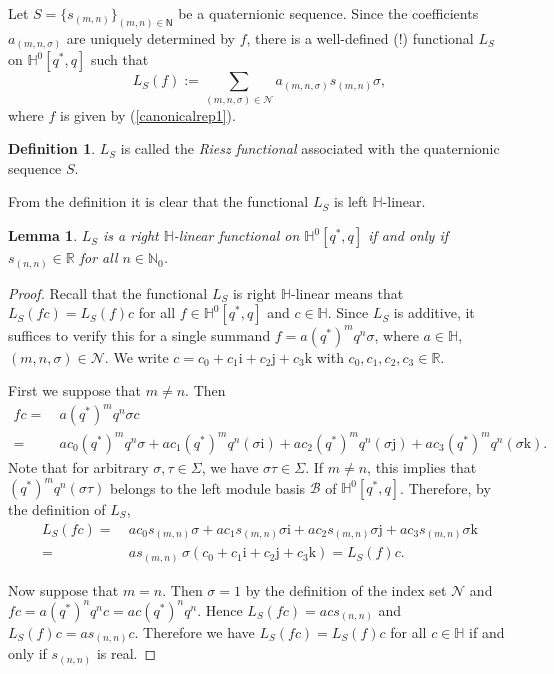 \documentclass[11pt,a4paper]{amsart}
\newtheorem{lemma}[theorem]{Lemma}
\theoremstyle{definition}
\newtheorem{definition}[theorem]{Definition}
\begin{document}
Let $S=\{s_{(m,n)}\}_{(m,n) \in \mathsf{{N}}}$ be a quaternionic sequence. Since
the coefficients $a_{(m,n,\sigma )}$ are uniquely determined by $f$, there
is a well-defined (!) functional $L_{S}$ on
$\mathbb{H}^{0}[q^{*}, q]$ such that
%
\begin{equation}
\label{defintionriesz}
L_{S}(f) := \sum _{(m,n,\sigma )\in \mathcal{N}} a_{(m,n,\sigma )}s_{(m,n)}
\sigma ,
\end{equation}
%
where $f$ is given by (\ref{canonicalrep1}).
%
\begin{definition}
\label{defn5.1}
$L_{S}$ is called the \emph{Riesz functional} associated with the quaternionic
sequence $S$.
\end{definition}

From the definition it is clear that the functional $L_{S}$ is left
$\mathbb{H}$-linear.
%
\begin{lemma}%
\label{twosidedls}
$L_{S}$ is a right $\mathbb{H}$-linear functional on $ \mathbb{H}^{0}[q^{*}, q]$ if and only if $s_{(n,n)}\in \mathbb{R}$ for
all $n\in \mathbb{N}_{0}$.
\end{lemma}
%
\begin{proof}
Recall that the functional $L_{S}$ is right $\mathbb{H}$-linear means that
$L_{S}(f c)=L_{S}(f)c$ for all $f\in \mathbb{H}^{0}[q^{*}, q]$ and
$c\in \mathbb{H}$. Since $L_{S}$ is additive, it suffices to verify this
for a single summand $f=a (q^{*})^{m} q^{n} \sigma $, where
$a\in \mathbb{H}$, $(m,n,\sigma )\in \mathcal{N}$. We write
$c =c_{0}+c_{1}\mathrm{i}+c_{2}\mathrm{j}+ c_{3}\mathrm{k}$ with
$c_{0}, c_{1},c_{2},c_{3}\in \mathbb{R}$.

First we suppose that $m\neq n$. Then
%
\begin{align*}
f c =& ~ a (q^{*})^{m} q^{n} \sigma c
\\
= & ~ a c_{0} (q^{*})^{m} q^{n} \sigma + a c_{1} (q^{*})^{m} q^{n} (
\sigma \mathrm{i}) + a c_{2} (q^{*})^{m} q^{n} (\sigma \mathrm{j})+ a c_{3}
(q^{*})^{m} q^{n} (\sigma \mathrm{k}).
\end{align*}
%
Note that for arbitrary $\sigma , \tau \in \Sigma $, we have
$\sigma \tau \in \Sigma $. If $m\neq n$, this implies that
$(q^{*})^{m} q^{n} (\sigma \tau )$ belongs to the left module basis
$\mathcal{B}$ of $ \mathbb{H}^{0}[q^{*}, q]$. Therefore, by the definition
of $L_{S}$,
%
\begin{align*}
L_{S}(f c)= & ~ a c_{0} s_{(m,n)} \sigma + a c_{1}s_{(m,n)} \sigma
\mathrm{i}+ a c_{2} s_{(m,n)} \sigma \mathrm{j}+ a c_{3} s_{(m,n)}
\sigma \mathrm{k}
\\
=&~ a s_{(m,n)}\,\sigma (c_{0}+c_{1}\mathrm{i}+c_{2}\mathrm{j}+ c_{3}
\mathrm{k})=L_{S}(f) c .
\end{align*}

Now suppose that $m=n$. Then $\sigma =1$ by the definition of the index
set $\mathcal{N}$ and $fc=a(q^{*})^{n}q^{n} c=ac(q^{*})^{n}q^{n}$. Hence
$L_{S}(fc)=acs_{(n,n)}$ and $L_{S}(f)c=as_{(n,n)}c$. Therefore we have
$L_{S}(fc)=L_{S}(f)c$ for all $c\in \mathbb{H}$ if and only if
$s_{(n,n)}$ is real.
\end{proof}
\end{document}
